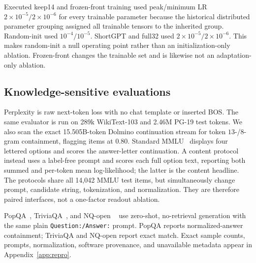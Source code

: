 Executed keep14 and frozen-front training used peak/minimum LR
$2\times10^{-5}/2\times10^{-6}$ for every trainable parameter because the
historical distributed parameter grouping assigned all trainable tensors to
the inherited group. Random-init used $10^{-4}/10^{-5}$. ShortGPT and full32
used $2\times10^{-5}/2\times10^{-6}$. This makes random-init a null operating
point rather than an initialization-only ablation. Frozen-front changes the
trainable set and is likewise not an adaptation-only ablation.

\subsection{Knowledge-sensitive evaluations}
Perplexity is raw next-token loss with no chat template or inserted BOS.
The same evaluator is run on 289k WikiText-103 and 2.46M PG-19 test tokens.
We also scan the exact 15.505B-token Dolmino continuation stream for token
$13$-/$8$-gram containment, flagging items at 0.80.
Standard MMLU~\citep{hendrycks2021mmlu} displays four lettered options and
scores the answer-letter continuation. A content protocol instead uses a
label-free prompt and scores each full option text, reporting both summed and
per-token mean log-likelihood; the latter is the content headline. The
protocols share all 14,042 MMLU test items, but simultaneously change prompt,
candidate string, tokenization, and normalization. They are therefore paired
interfaces, not a one-factor readout ablation.

PopQA~\citep{mallen2023popqa}, TriviaQA~\citep{joshi2017triviaqa}, and NQ-open
~\citep{kwiatkowski2019natural} use zero-shot, no-retrieval generation with the
same plain \texttt{Question:/Answer:} prompt. PopQA reports normalized-answer
containment; TriviaQA and NQ-open report exact match. Exact sample counts,
prompts, normalization, software provenance, and unavailable metadata appear
in Appendix~\ref{app:repro}.
